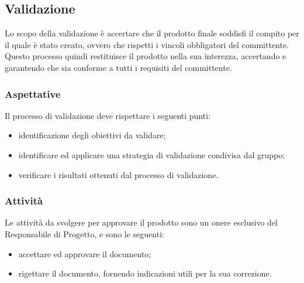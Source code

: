\subsection{Validazione}
Lo scopo della validazione è accertare che il prodotto finale soddisfi il compito per il quale è stato creato, ovvero che rispetti i vincoli obbligatori del committente. Questo processo quindi restituisce il prodotto nella sua interezza, accertando e garantendo che sia conforme a tutti i requisiti del committente.

\subsubsection{Aspettative}
Il processo di validazione deve rispettare i seguenti punti:
\begin{itemize}
	\item identificazione degli obiettivi da validare;
	\item identificare ed applicare una strategia di validazione condivisa dal gruppo;
	\item verificare i risultati ottenuti dal processo di validazione.
\end{itemize}

\subsubsection{Attività}
Le attività da svolgere per approvare il prodotto sono un onere esclusivo del Responsabile di Progetto, e sono le seguenti:

\begin{itemize}
	\item accettare ed approvare il documento;
	\item rigettare il documento, fornendo indicazioni utili per la sua correzione.
\end{itemize}
